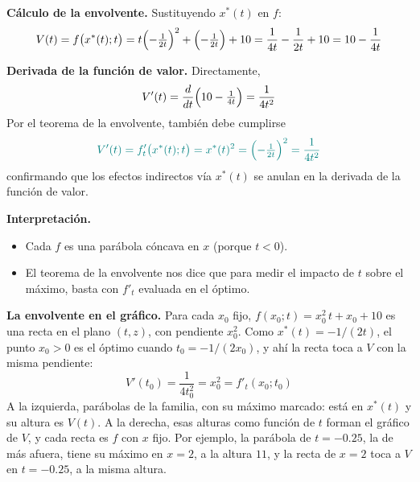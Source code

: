 \documentclass{article}
\begin{document}
\textbf{Cálculo de la envolvente.} Sustituyendo \(x^*(t)\) en \(f\):
\[
V(t)
= f\bigl(x^*(t);t\bigr)
= t\Bigl(-\tfrac{1}{2t}\Bigr)^2
+ \Bigl(-\tfrac{1}{2t}\Bigr)
+ 10
= \frac{1}{4t} - \frac{1}{2t} + 10
= 10 - \frac{1}{4t}
\]

\textbf{Derivada de la función de valor.} Directamente,
\[
V'(t)
= \frac{d}{dt}\Bigl(10 - \tfrac{1}{4t}\Bigr)
= \frac{1}{4t^2}
\]
Por el teorema de la envolvente, también debe cumplirse
\[
\color{teal}
V'(t)
= f'_t\bigl(x^*(t);t\bigr)
= x^*(t)^2
= \Bigl(-\tfrac{1}{2t}\Bigr)^2
= \frac{1}{4t^2}
\]
confirmando que los efectos indirectos vía \(x^*(t)\) se anulan en la derivada de la función de valor.

\textbf{Interpretación.}
\begin{itemize}
  \item Cada \(f\) es una parábola cóncava en \(x\) (porque \(t<0\)).
  \item El teorema de la envolvente nos dice que para medir el impacto de \(t\) sobre el máximo, basta con \(f'_t\) evaluada en el óptimo.
\end{itemize}

\textbf{La envolvente en el gráfico.} Para cada \(x_0\) fijo, \(f(x_0;t)=x_0^2\,t+x_0+10\) es una recta en el plano \((t,z)\), con pendiente \(x_0^2\). Como \(x^*(t)=-1/(2t)\), el punto \(x_0>0\) es el óptimo cuando \(t_0=-1/(2x_0)\), y ahí la recta toca a \(V\) con la misma pendiente:
\[
V'(t_0)=\frac{1}{4t_0^2}=x_0^2=f'_t(x_0;t_0)
\]
A la izquierda, parábolas de la familia, con su máximo marcado: está en \(x^*(t)\) y su altura es \(V(t)\). A la derecha, esas alturas como función de \(t\) forman el gráfico de \(V\), y cada recta es \(f\) con \(x\) fijo. Por ejemplo, la parábola de \(t=-0.25\), la de más afuera, tiene su máximo en \(x=2\), a la altura \(11\), y la recta de \(x=2\) toca a \(V\) en \(t=-0.25\), a la misma altura.
\end{document}
